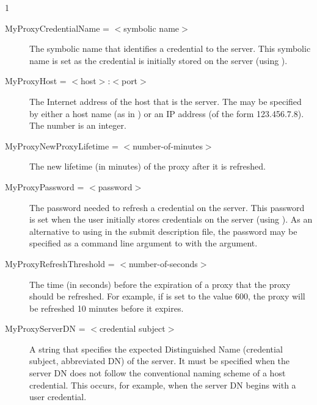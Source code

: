 \begin{ManPage}{\label{man-condor-submit}}{1}
\begin{description}

\item[MyProxyCredentialName = $<$symbolic name$>$]
The symbolic name that identifies a credential to the  server.
This symbolic name is set as the credential is
initially stored on the server (using ).



\item[MyProxyHost = $<$host$>$:$<$port$>$]
The Internet address of the host that is the  server.
The  may be specified by either a host name
(as in ) or an IP address
(of the form 123.456.7.8).
The  number is an integer.


\item[MyProxyNewProxyLifetime = $<$number-of-minutes$>$]
The new lifetime (in minutes) of the proxy after it is refreshed.


\item[MyProxyPassword = $<$password$>$]
The password needed to refresh a credential on the  server.
This password is set when the user initially stores
credentials on the server (using ).
As an alternative to using  in the
submit description file,
the password may be specified as a command line argument to 
with the  argument.


\item[MyProxyRefreshThreshold = $<$number-of-seconds$>$]
The time (in seconds) before the expiration of a proxy 
that the proxy should be refreshed.
For example, if  is set to the
value 600, the proxy will be refreshed 10 minutes before
it expires.


\item[MyProxyServerDN = $<$credential subject$>$]
A string that specifies the expected Distinguished Name (credential subject,
abbreviated DN)
of the  server.
It must be specified when the  server
DN does not follow the
conventional naming scheme of a host credential.
This occurs, for
example, when the   server DN begins with a user credential.



\end{description}
\end{ManPage}
